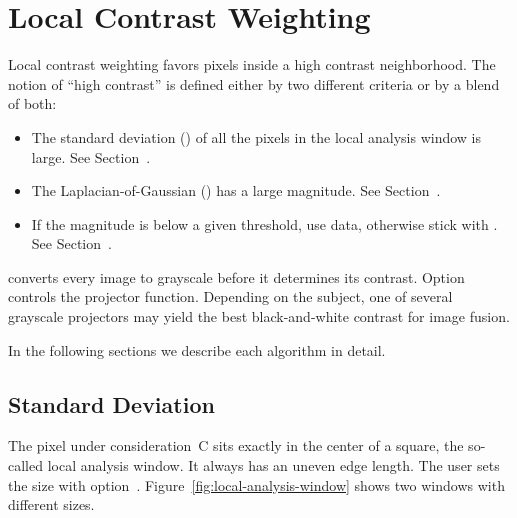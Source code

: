 

\section[Local Contrast Weighting]{Local Contrast Weighting
  \label{sec:local-contrast-weighting}
  }

Local contrast weighting favors pixels inside a high contrast
neighborhood.  The notion of ``high contrast'' is defined either by
two different criteria or by a blend of both:

\begin{itemize}
\item
  The standard deviation () of all the pixels in the
  local analysis window is large.  See
  Section~.

\item
  The Laplacian-of-Gaussian () has a large magnitude.
  See Section~.

\item
  If the  magnitude is below a given threshold, use
   data, otherwise stick with .  See
  Section~.
\end{itemize}

\App{} converts every  image to grayscale before it
determines its contrast.
Option~
controls the projector function.  Depending on the subject, one of
several grayscale projectors may yield the best black-and-white
contrast for image fusion.

In the following sections we describe each algorithm in detail.


\subsection[Standard Deviation]{Standard Deviation
  \label{sec:standard-deviation}
  }

The pixel under consideration~\textsf{C} sits exactly in the center of
a square, the so-called local analysis window.  It always has an uneven edge
length.  The user sets the size with
option~.
Figure~\ref{fig:local-analysis-window} shows two windows with
different sizes.


